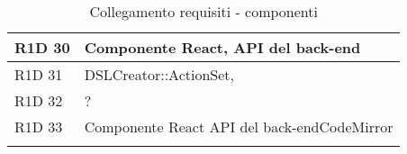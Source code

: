 \begin{center}
\begin{longtable}{ | l | p{8cm} |}
	R1D 30 & Componente React, API del back-end \\ \hline

	R1D 31 & DSLCreator::ActionSet, \\ \hline

	R1D 32 & ? \\ \hline

	R1D 33 & Componente React \newline API del back-endCodeMirror \\ \hline
        
    \caption{Collegamento requisiti - componenti}
  \end{longtable}
  \egroup
\end{center} 
